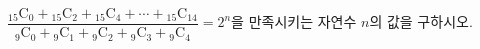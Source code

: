 $\dfrac{{}_{15}\mathrm{C}_0+{}_{15}\mathrm{C}_2+{}_{15}\mathrm{C}_4+\cdots+{}_{15}\mathrm{C}_{14}}{{}_9\mathrm{C}_0+{}_9\mathrm{C}_1+{}_9\mathrm{C}_2+{}_9\mathrm{C}_3+{}_9\mathrm{C}_4}=2^n$을 만족시키는 자연수 $n$의 값을 구하시오.
